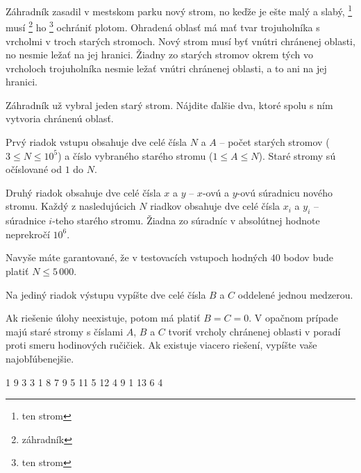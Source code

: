 





Záhradník zasadil v mestskom parku nový strom, no keďže je ešte malý a slabý,%
\footnote{ten strom}
musí%
\footnote{záhradník}
ho%
\footnote{ten strom}
ochrániť plotom. Ohradená oblasť má mať tvar trojuholníka s vrcholmi v troch
starých stromoch. Nový strom musí byť vnútri chránenej oblasti, no nesmie ležať
na jej hranici. Žiadny zo starých stromov okrem tých vo vrcholoch trojuholníka
nesmie ležať vnútri chránenej oblasti, a to ani na jej hranici.



Záhradník už vybral jeden starý strom. Nájdite ďalšie dva, ktoré spolu s ním
vytvoria chránenú oblasť.



Prvý riadok vstupu obsahuje dve celé čísla $N$ a $A$ -- počet starých stromov
($3 \leq N \leq 10^5$) a číslo vybraného starého stromu ($1 \leq A \leq N$).
Staré stromy sú očíslované od $1$ do $N$.

Druhý riadok obsahuje dve celé čísla $x$ a $y$ -- $x$-ovú a $y$-ovú súradnicu
nového stromu. Každý z nasledujúcich $N$ riadkov obsahuje dve celé čísla $x_i$ a
$y_i$ -- súradnice $i$-teho starého stromu. Žiadna zo súradníc v absolútnej
hodnote neprekročí $10^6$.

\bigskip

Navyše máte garantované, že v testovacích vstupoch hodných $40$ bodov bude
platiť $N \leq 5\,000$.



Na jediný riadok výstupu vypíšte dve celé čísla $B$ a $C$ oddelené jednou
medzerou.

Ak riešenie úlohy neexistuje, potom má platiť $B = C = 0$. V opačnom prípade
majú staré stromy s číslami $A$, $B$ a $C$ tvoriť vrcholy chránenej oblasti v
poradí proti smeru hodinových ručičiek. Ak existuje viacero riešení, vypíšte
vaše najobľúbenejšie.



 1
9 3
3 1
8 7
9 5
11 5
12 4
9 1
13 6
 4
\sampleCOMMENT

\sampleEND
\bigskip


